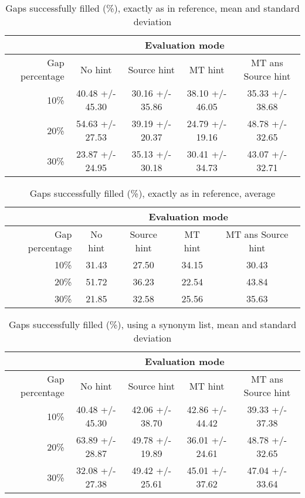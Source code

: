 \documentclass[11pt, oneside]{article}   	%
\begin{document}

\begin{table}
\centering
\begin{tabular}{|r |*{4}{c}|}
\hline
 &\multicolumn{4}{c|}{Evaluation mode}\\
\hline
Gap percentage & No hint & Source hint & MT hint & MT ans Source hint\\
\hline
10\%&40.48 +/- 45.30&30.16 +/- 35.86&38.10 +/- 46.05&35.33 +/- 38.68\\
20\%&54.63 +/- 27.53&39.19 +/- 20.37&24.79 +/- 19.16&48.78 +/- 32.65\\
30\%&23.87 +/- 24.95&35.13 +/- 30.18&30.41 +/- 34.73&43.07 +/- 32.71\\
\hline
\end{tabular}
\caption {Gaps successfully filled (\%), exactly as in reference, mean and standard deviation} \label{tab:title} 
\end{table}

\begin{table}
\centering
\begin{tabular}{|r |*{4}{c}|}
\hline
 &\multicolumn{4}{c|}{Evaluation mode}\\
\hline
Gap percentage & No hint & Source hint & MT hint & MT ans Source hint\\
\hline
10\%&31.43&27.50&34.15&30.43\\
20\%&51.72&36.23&22.54&43.84\\
30\%&21.85&32.58&25.56&35.63\\
\hline
\end{tabular}
\caption {Gaps successfully filled (\%), exactly as in reference, average} \label{tab:title} 
\end{table}

\begin{table}
\centering
\begin{tabular}{|r |*{4}{c}|}
\hline
 &\multicolumn{4}{c|}{Evaluation mode}\\
\hline
Gap percentage & No hint & Source hint & MT hint & MT ans Source hint\\
\hline
10\%&40.48 +/- 45.30&42.06 +/- 38.70&42.86 +/- 44.42&39.33 +/- 37.38\\
20\%&63.89 +/- 28.87&49.78 +/- 19.89&36.01 +/- 24.61&48.78 +/- 32.65\\
30\%&32.08 +/- 27.38&49.42 +/- 25.61&45.01 +/- 37.62&47.04 +/- 33.64\\
\hline
\end{tabular}
\caption {Gaps successfully filled (\%), using a synonym list, mean and standard deviation} \label{tab:title} 
\end{table}
\end{document}
